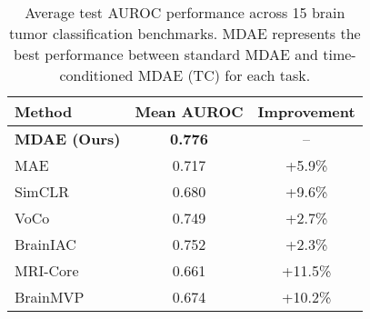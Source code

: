 \begin{table}[ht]
\centering
\caption{Average test AUROC performance across 15 brain tumor classification benchmarks. MDAE represents the best performance between standard MDAE and time-conditioned MDAE (TC) for each task.}
\label{tab:main_results}
\begin{tabular}{lcc}
\toprule
Method & Mean AUROC & Improvement \\
\midrule
\textbf{MDAE (Ours)} & \textbf{0.776} & -- \\
MAE & 0.717 & +5.9\% \\
SimCLR & 0.680 & +9.6\% \\
VoCo & 0.749 & +2.7\% \\
BrainIAC & 0.752 & +2.3\% \\
MRI-Core & 0.661 & +11.5\% \\
BrainMVP & 0.674 & +10.2\% \\
\bottomrule
\end{tabular}
\end{table}
